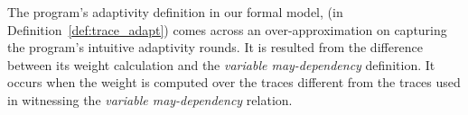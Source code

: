 \begin{example}
    \label{ex:multiRoundsS}
    The program's adaptivity definition in our formal model,
    (in Definition~\ref{def:trace_adapt})
     comes across an over-approximation on capturing the program's intuitive adaptivity rounds.
    It is resulted from the difference between its weight calculation and the \emph{variable may-dependency} definition.
    It occurs when the weight is computed over the traces different from the traces used in 
    witnessing the \emph{variable may-dependency} relation.
    

\end{example}
